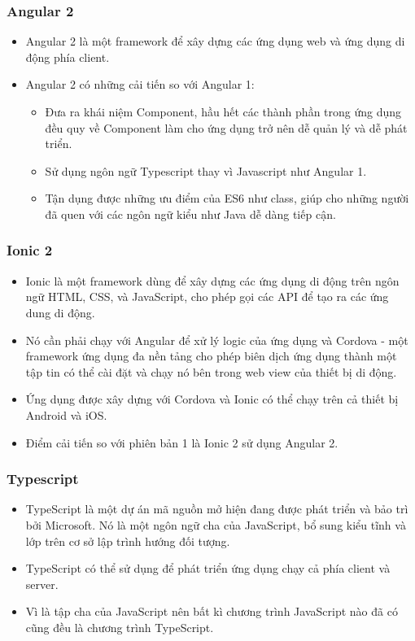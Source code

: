 \documentclass[a4paper,12pt,oneside]{article}
\begin{document}
\subsubsection{Angular 2 \cite{angular2}}
\begin{itemize}
\item Angular 2 là một framework để xây dựng các ứng dụng web và ứng dụng di động phía client. 
\item Angular 2 có những cải tiến so với Angular 1: 
\begin{itemize}
\item Đưa ra khái niệm Component, hầu hết các thành phần trong ứng dụng đều quy về Component làm cho ứng dụng trở nên dễ quản lý và dễ phát triển. 
\item Sử dụng ngôn ngữ Typescript thay vì Javascript như Angular 1. 
\item Tận dụng được những ưu điểm của ES6 như class, giúp cho những người đã quen với các ngôn ngữ kiểu như Java dễ dàng tiếp cận.
\end{itemize}
\end{itemize}

\subsubsection{Ionic 2 \cite{ionic}}
\begin{itemize}
\item Ionic là một framework dùng để xây dựng các ứng dụng di động trên ngôn ngữ HTML, CSS, và JavaScript, cho phép gọi các API để tạo ra các ứng dung di động.
\item Nó cần phải chạy với Angular để xử lý logic của ứng dụng và Cordova - một framework ứng dụng đa nền tảng cho phép biên dịch ứng dụng thành một tập tin có thể cài đặt và chạy nó bên trong web view của thiết bị di động. 
\item Ứng dụng được xây dựng với Cordova và Ionic có thể chạy trên cả thiết bị Android và iOS.
\item Điểm cải tiến so với phiên bản 1 là Ionic 2 sử dụng Angular 2.
\end{itemize}

\subsubsection{Typescript \cite{typescript}}
\begin{itemize}
\item TypeScript là một dự án mã nguồn mở hiện đang được phát triển và bảo trì bởi Microsoft. Nó là một ngôn ngữ cha của JavaScript, bổ sung kiểu tĩnh và lớp trên cơ sở lập trình hướng đối tượng. 
\item TypeScript có thể sử dụng để phát triển ứng dụng chạy cả phía client và server. 
\item Vì là tập cha của JavaScript nên bất kì chương trình JavaScript nào đã có cũng đều là chương trình TypeScript.
\end{itemize}
  
\end{document}
